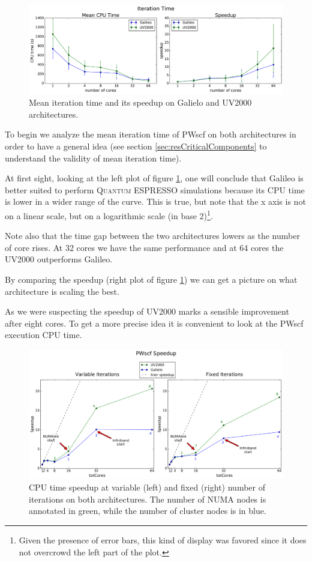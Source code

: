 \documentclass[a4paper,12pt]{article}
\newcommand\QE{\textsc{Quantum} ESPRESSO }
\begin{document}
\begin{figure}[hhh!]
\centerline{ \includegraphics[width=1.2\linewidth]{arch_compare_iterations.pdf}	}
	\caption{Mean iteration time and its speedup on Galielo and UV2000 architectures.}
	\label{fig:archCompareIterations}
\end{figure}

To begin we analyze the mean iteration time of PWscf on both architectures in order to have a general idea (see section \ref{sec:resCriticalComponents} to understand the validity of mean iteration time).

At first sight, looking at the left plot of figure \ref{fig:archCompareIterations}, one will conclude that Galileo is better suited to perform \QE simulations because its CPU time is lower in a wider range of the curve.
This is true, but note that the x axis is not on a linear scale, but on a logarithmic scale (in base 2)\footnote{Given the presence of error bars, this kind of display was favored since it does not overcrowd the left part of the plot.}.

Note also that the time gap between the two architectures lowers as the number of core rises. 
At 32 cores we have the same performance and at 64 cores the UV2000 outperforms Galileo.

By comparing the speedup (right plot of figure \ref{fig:archCompareIterations}) we can get a picture on what architecture is scaling the best.

As we were suspecting the speedup of UV2000 marks a sensible improvement after eight cores.
To get a more precise idea it is convenient to look at the PWscf execution CPU time.


\begin{figure}[hhh!]
\centerline{ \includegraphics[width=1.2\linewidth]{arch_global_2.pdf}	}
	\caption{CPU time speedup at variable (left) and fixed (right) number of iterations on both architectures. The number of NUMA nodes is annotated in green, while the number of cluster nodes is in blue.}
	\label{fig:archGlobal}
\end{figure}
\end{document}
